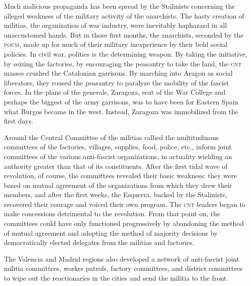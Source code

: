 \indexCNT\indexPOUM{}
Much malicious propaganda has been spread by the Stalinists concerning the alleged weakness of the military activity of the anarchists. The hasty creation of militias, the organization of war industry, were inevitably haphazard in all unaccustomed hands. But in those first months, the anarchists, seconded by the \textsc{poum}, made up for much of their military inexperience by their bold social policies. In civil war, politics is the determining weapon. By taking the initiative, by seizing the factories, by encouraging the peasantry to take the land, the \textsc{cnt} masses crushed the Catalonian garrisons. By marching into Aragon as social liberators, they roused the peasantry to paralyze the mobility of the fascist forces. In the plans of the generals, Zaragoza, seat of the War College and perhaps the biggest of the army garrisons, was to have been for Eastern Spain what Burgos became in the west. Instead, Zaragoza was immobilized from the first days.

\indexCNT{}
Around the Central Committee of the militias rallied the multitudinous committees of the factories, villages, supplies, food, police, etc., inform joint committees of the various anti-fascist organizations, in actuality wielding an authority greater than that of its constituents. After the first tidal wave of revolution, of course, the committees revealed their basic weakness: they were based on mutual agreement of the organizations from which they drew their members, and after the first weeks, the Esquerra, backed by the Stalinists, recovered their courage and voiced their own program. The \textsc{cnt} leaders began to make concessions detrimental to the revolution. From that point on, the committees could have only functioned progressively by abandoning the method of mutual agreement and adopting the method of majority decisions by democratically elected delegates from the militias and factories.

The Valencia and Madrid regions also developed a network of anti-fascist joint militia committees, worker patrols, factory committees, and district committees to wipe out the reactionaries in the cities and send the militia to the front.

